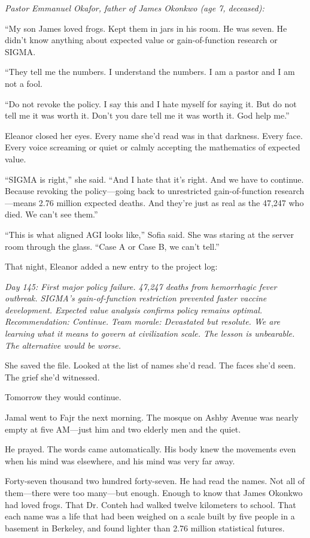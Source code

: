 \emph{Pastor Emmanuel Okafor, father of James Okonkwo (age 7, deceased):}

``My son James loved frogs. Kept them in jars in his room. He was seven. He didn't know anything about expected value or gain-of-function research or SIGMA.

``They tell me the numbers. I understand the numbers. I am a pastor and I am not a fool.

``Do not revoke the policy. I say this and I hate myself for saying it. But do not tell me it was worth it. Don't you dare tell me it was worth it. God help me.''

Eleanor closed her eyes. Every name she'd read was in that darkness. Every face. Every voice screaming or quiet or calmly accepting the mathematics of expected value.

``SIGMA is right,'' she said. ``And I hate that it's right. And we have to continue. Because revoking the policy---going back to unrestricted gain-of-function research---means 2.76 million expected deaths. And they're just as real as the 47,247 who died. We can't see them.''

``This is what aligned AGI looks like,'' Sofia said. She was staring at the server room through the glass. ``Case A or Case B, we can't tell.''

That night, Eleanor added a new entry to the project log:

\textit{Day 145: First major policy failure. 47,247 deaths from hemorrhagic fever outbreak. SIGMA's gain-of-function restriction prevented faster vaccine development. Expected value analysis confirms policy remains optimal. Recommendation: Continue. Team morale: Devastated but resolute. We are learning what it means to govern at civilization scale. The lesson is unbearable. The alternative would be worse.}

She saved the file. Looked at the list of names she'd read. The faces she'd seen. The grief she'd witnessed.

Tomorrow they would continue.

\scenebreak

Jamal went to Fajr the next morning. The mosque on Ashby Avenue was nearly empty at five AM---just him and two elderly men and the quiet.

He prayed. The words came automatically. His body knew the movements even when his mind was elsewhere, and his mind was very far away.

Forty-seven thousand two hundred forty-seven. He had read the names. Not all of them---there were too many---but enough. Enough to know that James Okonkwo had loved frogs. That Dr. Conteh had walked twelve kilometers to school. That each name was a life that had been weighed on a scale built by five people in a basement in Berkeley, and found lighter than 2.76 million statistical futures.

